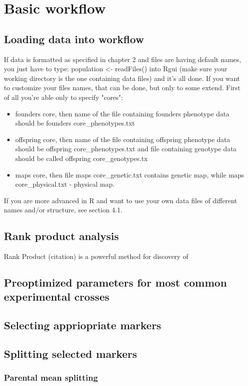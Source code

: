 \documentclass{article}
\begin{document}
\section{Basic workflow}
\begin{multicols}{2}
\subsection{Loading data into workflow}
If data is formatted as specified in chapter 2 and files are having default names, you just have to type: population <-  readFiles() into Rgui (make sure your working directory is the one containing data files) and it's all done. If you want to customize your files names, that can be done, but only to some extend. First of all you're able only to specify "cores": 
\begin{itemize}
\item  founders core, then name of the file containing founders phenotype data should be founders core\_phenotypes.txt
\item  offspring core,  then name of the file containing offspring phenotype data should be offspring core\_phenotypes.txt and file containing genotype data should be called offspring core\_genotypes.tx
\item maps core, then file maps core\_genetic.txt contains genetic map, while maps core\_physical.txt - physical map.
\end{itemize}
If you are more advanced in R and want to use your own data files of different names and/or structure, see section 4.1.
\subsection{Rank product analysis}
Rank Product (citation) is a powerful method for discovery of
 
\subsection{Preoptimized parameters for most common experimental crosses}
\blindtext
\subsection{Selecting appriopriate markers}
\blindtext
\subsection{Splitting selected markers}
\subsubsection{Parental mean splitting}
\blindtext

\end{multicols}
\end{document}
